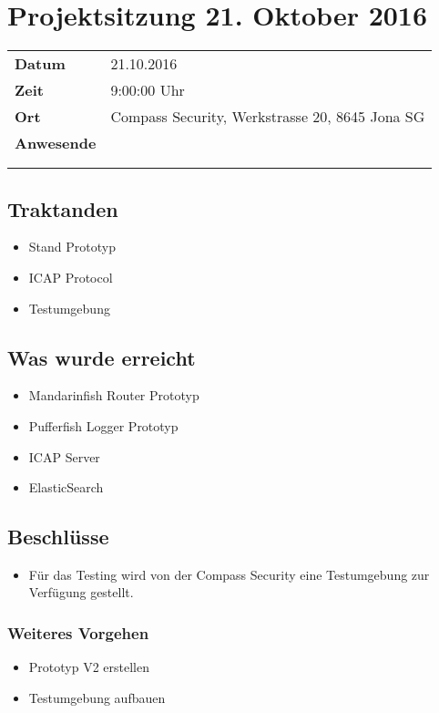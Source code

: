 \documentclass[class=scrbook,crop=false]{standalone}
\begin{document}
	\section{Projektsitzung 21. Oktober 2016}

	\begin{tabular}{ll}
		\textbf{Datum} & 21.10.2016 \\
		\textbf{Zeit} & 9:00\textendash10:00 Uhr \\
		\textbf{Ort} & Compass Security, Werkstrasse 20, 8645 Jona SG \\
		\textbf{Anwesende} & \ibuf \\ & \fbif \\ & \sadf
	\end{tabular}

	\subsection*{Traktanden}
	\begin{itemize}
		\item Stand Prototyp
		\item ICAP Protocol
		\item Testumgebung
	\end{itemize}

	\subsection*{Was wurde erreicht}
	\begin{itemize}
		\item Mandarinfish Router Prototyp
		\item Pufferfish Logger Prototyp
		\item ICAP Server
		\item ElasticSearch
	\end{itemize}

	\subsection*{Beschlüsse}
	\begin{itemize}
		\item Für das Testing wird von der Compass Security eine Testumgebung zur Verfügung gestellt.
	\end{itemize}

	\subsubsection*{Weiteres Vorgehen}
	\begin{itemize}
		\item Prototyp V2 erstellen
		\item Testumgebung aufbauen
	\end{itemize}
\end{document}
